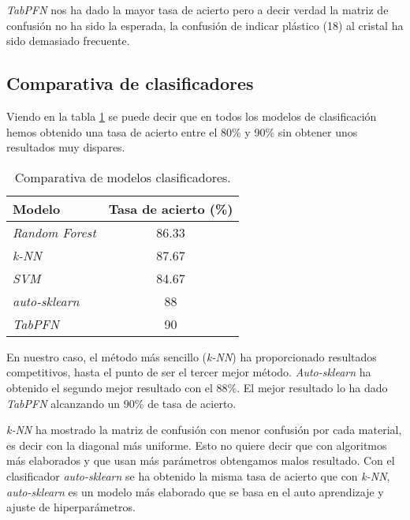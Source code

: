 \textit{TabPFN} nos ha dado la mayor tasa de acierto pero a decir verdad la matriz de confusión no ha sido la esperada, la confusión de indicar plástico (18) al cristal ha sido demasiado frecuente.
\clearpage

\subsection{Comparativa de clasificadores}

Viendo en la tabla \ref{tab:comparativa} se puede decir que en todos los modelos de clasificación hemos obtenido una tasa de acierto entre el 80\% y 90\% sin obtener unos resultados muy dispares.

\begin{table}[h]
\begin{center}
\begin{tabular}{l|c}
\hline
\rowcolor[gray]{0.9} 
\textbf{Modelo} & \textbf{Tasa de acierto (\%)} \\ \hline
\textit{Random Forest}   & 86.33                         \\ 
\rowcolor[gray]{0.9} 
\textit{k-NN}            & 87.67                         \\ 
\textit{SVM}             & 84.67                         \\ 
\rowcolor[gray]{0.9} 
\textit{auto-sklearn}    & 88                            \\ 
\textit{TabPFN}          & 90                            \\ \hline
\end{tabular}
\caption{Comparativa de modelos clasificadores.}
\label{tab:comparativa}
\end{center}
\end{table}

En nuestro caso, el método más sencillo (\textit{k-NN}) ha proporcionado resultados competitivos, hasta el punto de ser el tercer mejor método. \textit{Auto-sklearn} ha obtenido el segundo mejor resultado con el 88\%. El mejor resultado lo ha dado \textit{TabPFN} alcanzando un 90\% de tasa de acierto.

\textit{k-NN} ha mostrado la matriz de confusión con menor confusión por cada material, es decir con la diagonal más uniforme. Esto no quiere decir que con algoritmos más elaborados y que usan más parámetros obtengamos malos resultado. Con el clasificador \textit{auto-sklearn} se ha obtenido la misma tasa de acierto que con \textit{k-NN}, \textit{auto-sklearn} es un modelo más elaborado que se basa en el auto aprendizaje y ajuste de hiperparámetros.

